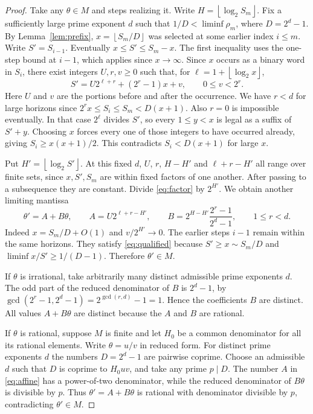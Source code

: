 \documentclass[11pt]{article}
\newcommand{\fl}[1]{\left\lfloor#1\right\rfloor}
\begin{document}
\begin{proof}
Take any $\theta\in M$ and steps realizing it. Write $H=\fl{\log_2 S_m}$. Fix a sufficiently large prime exponent $d$ such that $1/D<\liminf\rho_m$, where $D=2^d-1$. By Lemma~\ref{lem:prefix}, $x=\fl{S_m/D}$ was selected at some earlier index $i\le m$. Write $S'=S_{i-1}$. Eventually $x\le S'\le S_m-x$. The first inequality uses the one-step bound at $i-1$, which applies since $x\to\infty$. Since $x$ occurs as a binary word in $S_i$, there exist integers $U,r,v\ge0$ such that, for $\ell=1+\fl{\log_2 x}$,
\begin{equation}\label{eq:factor}
 S'=U2^{\ell+r}+(2^r-1)x+v,\qquad 0\le v<2^r .
\end{equation}
Here $U$ and $v$ are the portions before and after the occurrence. We have $r<d$ for large horizons since $2^r x\le S_i\le S_m<D(x+1)$. Also $r=0$ is impossible eventually. In that case $2^\ell$ divides $S'$, so every $1\le y<x$ is legal as a suffix of $S'+y$. Choosing $x$ forces every one of those integers to have occurred already, giving $S_i\ge x(x+1)/2$. This contradicts $S_i<D(x+1)$ for large $x$.

Put $H'=\fl{\log_2 S'}$. At this fixed $d$, $U$, $r$, $H-H'$ and $\ell+r-H'$ all range over finite sets, since $x,S',S_m$ are within fixed factors of one another. After passing to a subsequence they are constant. Divide \eqref{eq:factor} by $2^{H'}$. We obtain another limiting mantissa
\begin{equation}\label{eq:affine}
 \theta'=A+B\theta,\qquad A=U2^{\ell+r-H'},\qquad
 B=2^{H-H'}\frac{2^r-1}{2^d-1},\qquad 1\le r<d .
\end{equation}
Indeed $x=S_m/D+O(1)$ and $v/2^{H'}\to0$. The earlier steps $i-1$ remain within the same horizons. They satisfy \eqref{eq:qualified} because $S'\ge x\sim S_m/D$ and $\liminf x/S'\ge 1/(D-1)$. Therefore $\theta'\in M$.

If $\theta$ is irrational, take arbitrarily many distinct admissible prime exponents $d$. The odd part of the reduced denominator of $B$ is $2^d-1$, by $\gcd(2^r-1,2^d-1)=2^{\gcd(r,d)}-1=1$. Hence the coefficients $B$ are distinct. All values $A+B\theta$ are distinct because the $A$ and $B$ are rational.

If $\theta$ is rational, suppose $M$ is finite and let $H_0$ be a common denominator for all its rational elements. Write $\theta=u/v$ in reduced form. For distinct prime exponents $d$ the numbers $D=2^d-1$ are pairwise coprime. Choose an admissible $d$ such that $D$ is coprime to $H_0uv$, and take any prime $p\mid D$. The number $A$ in \eqref{eq:affine} has a power-of-two denominator, while the reduced denominator of $B\theta$ is divisible by $p$. Thus $\theta'=A+B\theta$ is rational with denominator divisible by $p$, contradicting $\theta'\in M$.
\end{proof}
\end{document}

